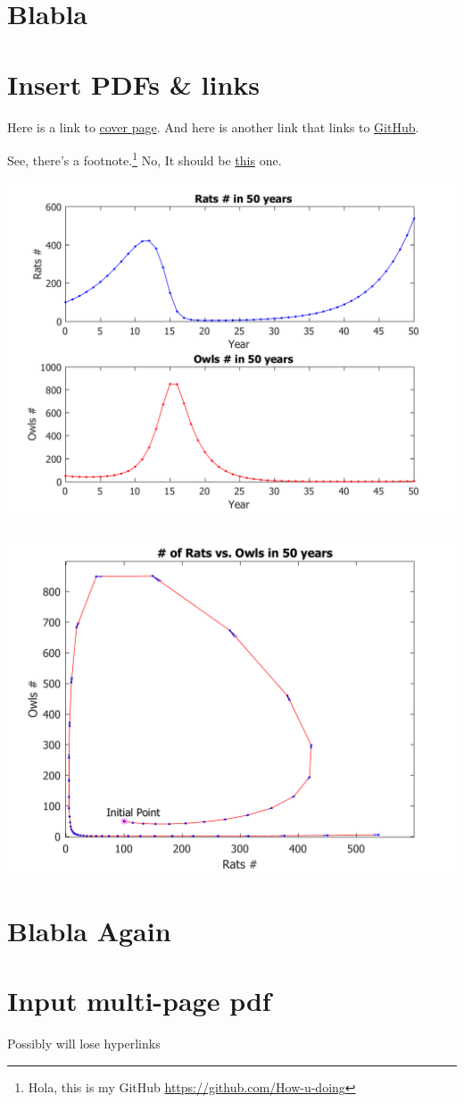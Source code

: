 \documentclass{book}
\begin{document}
	
	\chapter{Blabla}
	\lipsum
	\lipsum
	
	
	\chapter{Insert PDFs \& links}	
	Here is a link to \hyperref[fig:lion]{cover page}.
	And here is another link that links to
	\href{https://github.com/How-u-doing}{GitHub}.
			
	\noindent See, there's a footnote.\footnote{Hola, this is my GitHub
	\url{https://github.com/How-u-doing}} No, It should be 
	\hyperref[blabla_again]{this} one.
	
	\lipsum
	
	\clearpage 
	\newpage
	\includegraphics[scale=0.5]{svg/test}
	\label{test}
	
	\includegraphics[scale=0.5]{svg/image}
	\label{image}
	\clearpage
	\newpage
	
	\chapter{Blabla Again}\label{blabla_again}
	\lipsum
	\lipsum
	
	\chapter{Input multi-page pdf}
	Possibly will lose hyperlinks
	
	
	
\end{document}
